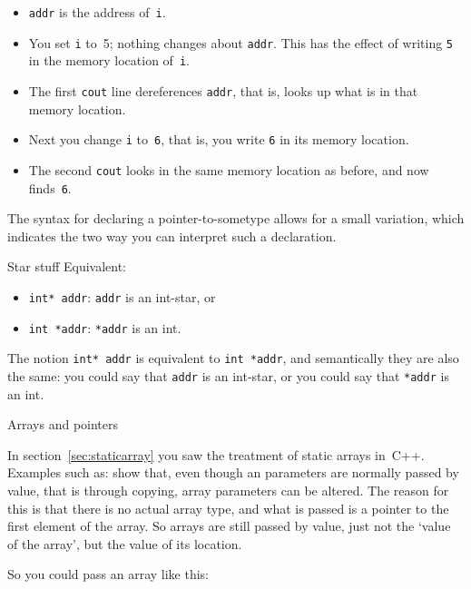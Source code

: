 \begin{itemize}
\item \lstinline{addr} is the address of~\lstinline{i}.
\item You set \lstinline{i} to~5; nothing changes about \lstinline{addr}. This has the
  effect of writing \lstinline{5} in the memory location of~\lstinline{i}.
\item The first \lstinline{cout} line dereferences \lstinline{addr}, that is, looks up
  what is in that memory location.
\item Next you change \lstinline{i} to~\lstinline{6}, that is, you write \lstinline{6} in its
  memory location.
\item The second \lstinline{cout} looks in the same memory location as before,
  and now finds~\lstinline{6}.
\end{itemize}

The syntax for declaring a pointer-to-sometype allows for a small
variation, which indicates the two way you can interpret such a declaration.

\begin{block}{Star stuff}
  \label{sl:starstuff}
  Equivalent:
  \begin{itemize}
  \item \lstinline{int* addr}: \lstinline{addr} is an int-star, or
  \item \lstinline{int *addr}: \lstinline{*addr} is an int.
  \end{itemize}
\end{block}

The notion \lstinline{int* addr} is equivalent to \lstinline{int *addr}, and
semantically they are also the same: you could say that \lstinline{addr} is an
int-star, or you could say that \lstinline{*addr} is an int.

 {Arrays and pointers}
\label{sec:arraypointer}

In section~\ref{sec:staticarray} you saw the treatment of static
arrays in~C++. Examples such as:
%
%
show that, even though an parameters are normally passed by value, that is
through copying, array parameters can be altered. The reason for this
is that there is no actual array type, and what is passed is a pointer
to the first element of the array. So arrays are still passed by
value, just not the `value of the array', but the value of its
location.

So you could pass an array like this:
%

